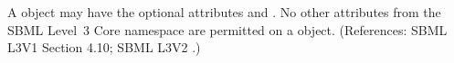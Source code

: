A \Constraint object may have the optional attributes  and
.  No other attributes from the SBML Level~3 Core namespace
are permitted on a \Constraint object.  (References: SBML L3V1 Section 4.10; SBML L3V2
.)

